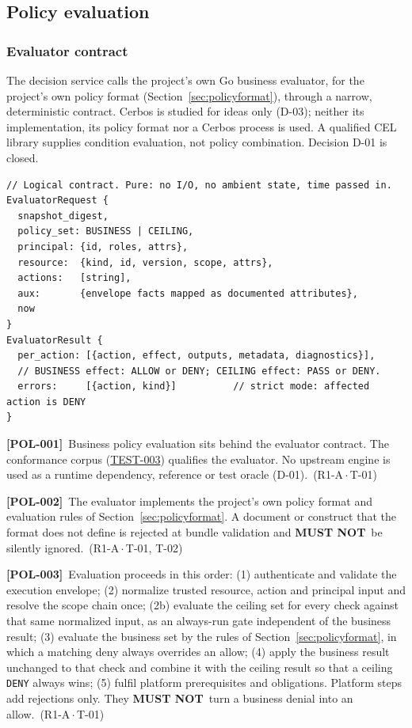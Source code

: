 \documentclass[11pt,a4paper]{article}
\newcommand{\mustnot}{\textbf{MUST NOT}}
\newcommand{\code}[1]{{\small\nolinkurl{#1}}}
\newcommand{\rr}[1]{\hyperlink{req:#1}{#1}}
\newcommand{\reqtag}[2]{{\footnotesize\color{accent}(#1\,$\cdot$\,#2)}}
\newcommand{\req}[4]{\par\noindent\hypertarget{req:#1}{\textbf{[#1]}}\ #4\ \reqtag{#2}{#3}\par}
\begin{document}
\subsection{Policy evaluation}\label{sec:policy}
\subsubsection{Evaluator contract}
The decision service calls the project's own Go business evaluator, for the project's own policy format (Section~\ref{sec:policyformat}), through a narrow, deterministic contract. Cerbos is studied for ideas only (D-03); neither its implementation, its policy format nor a Cerbos process is used. A qualified CEL library supplies condition evaluation, not policy combination. Decision D-01 is closed.
\begin{lstlisting}
// Logical contract. Pure: no I/O, no ambient state, time passed in.
EvaluatorRequest {
  snapshot_digest,
  policy_set: BUSINESS | CEILING,
  principal: {id, roles, attrs},
  resource:  {kind, id, version, scope, attrs},
  actions:   [string],
  aux:       {envelope facts mapped as documented attributes},
  now
}
EvaluatorResult {
  per_action: [{action, effect, outputs, metadata, diagnostics}],
  // BUSINESS effect: ALLOW or DENY; CEILING effect: PASS or DENY.
  errors:     [{action, kind}]          // strict mode: affected action is DENY
}
\end{lstlisting}
\req{POL-001}{R1-A}{T-01}{Business policy evaluation sits behind the evaluator contract. The conformance corpus (\rr{TEST-003}) qualifies the evaluator. No upstream engine is used as a runtime dependency, reference or test oracle (D-01).}
\req{POL-002}{R1-A}{T-01, T-02}{The evaluator implements the project's own policy format and evaluation rules of Section~\ref{sec:policyformat}. A document or construct that the format does not define is rejected at bundle validation and \mustnot\ be silently ignored.}
\req{POL-003}{R1-A}{T-01}{Evaluation proceeds in this order: (1) authenticate and validate the execution envelope; (2) normalize trusted resource, action and principal input and resolve the scope chain once; (2b) evaluate the ceiling set for every check against that same normalized input, as an always-run gate independent of the business result; (3) evaluate the business set by the rules of Section~\ref{sec:policyformat}, in which a matching deny always overrides an allow; (4) apply the business result unchanged to that check and combine it with the ceiling result so that a ceiling \code{DENY} always wins; (5) fulfil platform prerequisites and obligations. Platform steps add rejections only. They \mustnot\ turn a business denial into an allow.}
\end{document}
